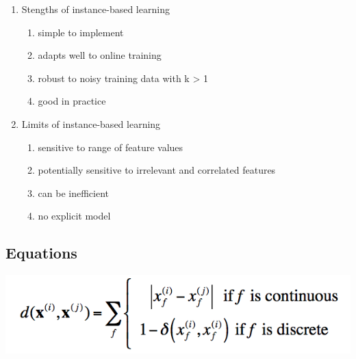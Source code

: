 \documentclass[a4paper]{article}
\begin{document}
\begin{enumerate}
\item Stengths of instance-based learning
  \begin{enumerate}
  \item simple to implement
  \item adapts well to online training
  \item robust to noisy training data with k > 1
  \item good in practice
  \end{enumerate}
\item Limits of instance-based learning
  \begin{enumerate}
  \item sensitive to range of feature values
  \item potentially sensitive to irrelevant and correlated features
  \item can be inefficient
  \item no explicit model
  \end{enumerate}
  
  
\end{enumerate}

\subsection{Equations}

\includegraphics{dist}

    
\end{document}
